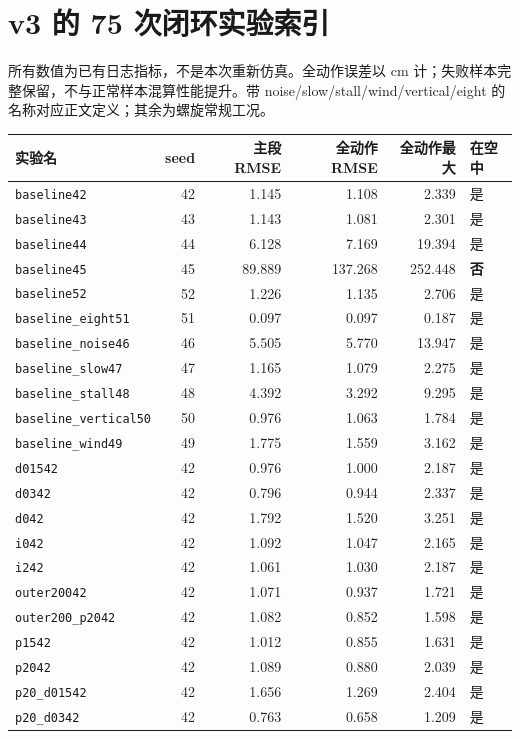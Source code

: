 \documentclass[UTF8,a4paper,11pt,fontset=fandol]{ctexart}
\newcommand{\code}[1]{{\small\nolinkurl{#1}}}
\begin{document}
\section{v3 的 75 次闭环实验索引}
所有数值为已有日志指标，不是本次重新仿真。全动作误差以 cm 计；失败样本完整保留，不与正常样本混算性能提升。带 noise/slow/stall/wind/vertical/eight 的名称对应正文定义；其余为螺旋常规工况。
{\footnotesize\begin{longtable}{L{5.0cm}rrrrL{1.0cm}}
\toprule 实验名 & seed & 主段 RMSE & 全动作 RMSE & 全动作最大 & 在空中\\\midrule\endhead
\code{baseline42} & 42 & 1.145 & 1.108 & 2.339 & 是\\
\code{baseline43} & 43 & 1.143 & 1.081 & 2.301 & 是\\
\code{baseline44} & 44 & 6.128 & 7.169 & 19.394 & 是\\
\code{baseline45} & 45 & 89.889 & 137.268 & 252.448 & \textbf{否}\\
\code{baseline52} & 52 & 1.226 & 1.135 & 2.706 & 是\\
\code{baseline_eight51} & 51 & 0.097 & 0.097 & 0.187 & 是\\
\code{baseline_noise46} & 46 & 5.505 & 5.770 & 13.947 & 是\\
\code{baseline_slow47} & 47 & 1.165 & 1.079 & 2.275 & 是\\
\code{baseline_stall48} & 48 & 4.392 & 3.292 & 9.295 & 是\\
\code{baseline_vertical50} & 50 & 0.976 & 1.063 & 1.784 & 是\\
\code{baseline_wind49} & 49 & 1.775 & 1.559 & 3.162 & 是\\
\code{d01542} & 42 & 0.976 & 1.000 & 2.187 & 是\\
\code{d0342} & 42 & 0.796 & 0.944 & 2.337 & 是\\
\code{d042} & 42 & 1.792 & 1.520 & 3.251 & 是\\
\code{i042} & 42 & 1.092 & 1.047 & 2.165 & 是\\
\code{i242} & 42 & 1.061 & 1.030 & 2.187 & 是\\
\code{outer20042} & 42 & 1.071 & 0.937 & 1.721 & 是\\
\code{outer200_p2042} & 42 & 1.082 & 0.852 & 1.598 & 是\\
\code{p1542} & 42 & 1.012 & 0.855 & 1.631 & 是\\
\code{p2042} & 42 & 1.089 & 0.880 & 2.039 & 是\\
\code{p20_d01542} & 42 & 1.656 & 1.269 & 2.404 & 是\\
\code{p20_d0342} & 42 & 0.763 & 0.658 & 1.209 & 是\\

\end{longtable}}
\end{document}
